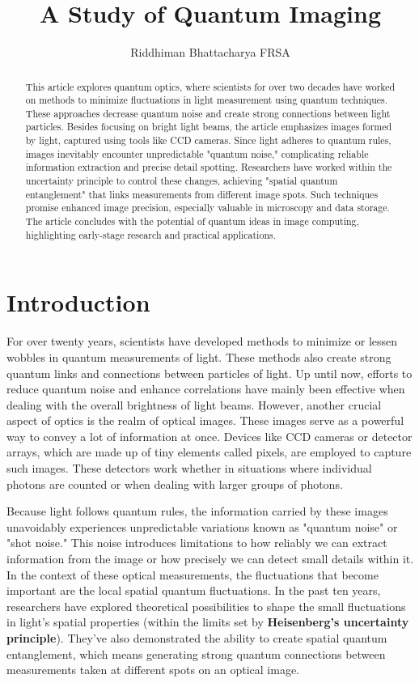 \documentclass{article}
\title{\huge \textbf{A Study of Quantum Imaging}}
\author{Riddhiman Bhattacharya FRSA}
\begin{document}
\maketitle

\begin{abstract}
\large
This article explores quantum optics, where scientists for over two decades have worked on methods to minimize fluctuations in light measurement using quantum techniques. These approaches decrease quantum noise and create strong connections between light particles. Besides focusing on bright light beams, the article emphasizes images formed by light, captured using tools like CCD cameras. Since light adheres to quantum rules, images inevitably encounter unpredictable "quantum noise," complicating reliable information extraction and precise detail spotting. Researchers have worked within the uncertainty principle to control these changes, achieving "spatial quantum entanglement" that links measurements from different image spots. Such techniques promise enhanced image precision, especially valuable in microscopy and data storage. The article concludes with the potential of quantum ideas in image computing, highlighting early-stage research and practical applications.
\end{abstract}

\large



\section{Introduction}
For over twenty years, scientists have developed methods to minimize or lessen wobbles in quantum measurements of light. These methods also create strong quantum links and connections between particles of light. 
Up until now, efforts to reduce quantum noise and enhance correlations have mainly been effective when dealing with the overall brightness of light beams. However, another crucial aspect of optics is the realm of optical images. These images serve as a powerful way to convey a lot of information at once. Devices like CCD cameras or detector arrays, which are made up of tiny elements called pixels, are employed to capture such images. These detectors work whether in situations where individual photons are counted or when dealing with larger groups of photons.

Because light follows quantum rules, the information carried by these images unavoidably experiences unpredictable variations known as "quantum noise" or "shot noise." This noise introduces limitations to how reliably we can extract information from the image or how precisely we can detect small details within it. In the context of these optical measurements, the fluctuations that become important are the local spatial quantum fluctuations.
In the past ten years, researchers have explored theoretical possibilities to shape the small fluctuations in light's spatial properties (within the limits set by \textbf{Heisenberg's uncertainty principle}). They've also demonstrated the ability to create spatial quantum entanglement, which means generating strong quantum connections between measurements taken at different spots on an optical image.
\end{document}
